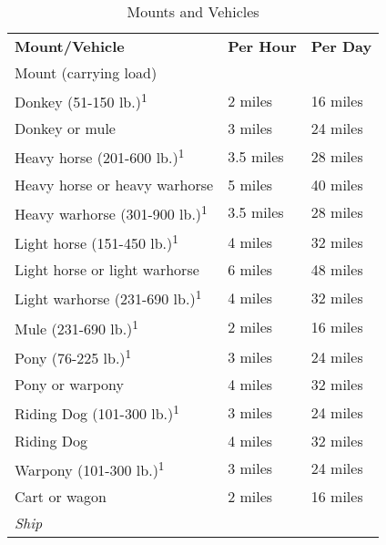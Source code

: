 \begin{table}[htb]
\sffamily
{}
\setlength{\tabcolsep}{1pt}
\caption{Mounts and Vehicles}
\begin{tabular}{lll}
\textbf{Mount/Vehicle} & \textbf{Per Hour} & \textbf{Per Day}\\
Mount (carrying load) & & \\
\hspace{1em}Donkey (51-150 lb.)\textsuperscript{1} & 2 miles & 16 miles\\
\hspace{1em}Donkey or mule & 3 miles & 24 miles\\
\hspace{1em}Heavy horse (201-600 lb.)\textsuperscript{1} & 3.5 miles & 28 miles\\
\hspace{1em}Heavy horse or heavy warhorse & 5 miles & 40 miles\\
\hspace{1em}Heavy warhorse (301-900 lb.)\textsuperscript{1} & 3.5 miles & 28 miles\\
\hspace{1em}Light horse (151-450 lb.)\textsuperscript{1} & 4 miles & 32 miles\\
\hspace{1em}Light horse or light warhorse & 6 miles & 48 miles\\
\hspace{1em}Light warhorse (231-690 lb.)\textsuperscript{1} & 4 miles & 32 miles\\
\hspace{1em}Mule (231-690 lb.)\textsuperscript{1} & 2 miles & 16 miles\\
\hspace{1em}Pony (76-225 lb.)\textsuperscript{1} & 3 miles & 24 miles\\
\hspace{1em}Pony or warpony & 4 miles & 32 miles\\
\hspace{1em}Riding Dog (101-300 lb.)\textsuperscript{1} & 3 miles & 24 miles\\
\hspace{1em}Riding Dog & 4 miles & 32 miles\\
\hspace{1em}Warpony (101-300 lb.)\textsuperscript{1} & 3 miles & 24 miles\\
Cart or wagon & 2 miles & 16 miles\\
\textit{Ship} & & \\

\end{tabular}
\end{table}
